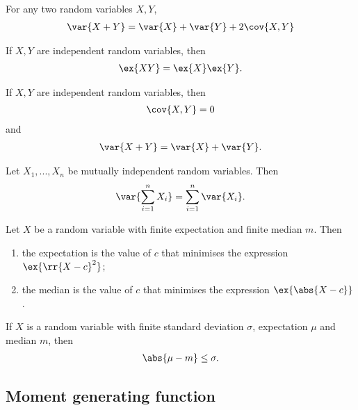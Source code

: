 \documentclass{article}
\begin{document}
\begin{theorem}
  For any two random variables $X,Y$,
  \begin{align*}
    \var{X+Y}=\var{X}+\var{Y}+2\cov{X,Y}
  \end{align*}
\end{theorem}

\begin{theorem}
  If $X,Y$ are independent random variables, then
  \begin{align*}
    \ex{XY}=\ex{X}\ex{Y}.
  \end{align*}
\end{theorem}

\begin{corollary}
  If $X,Y$ are independent random variables, then
  \begin{align*}
    \cov{X,Y}=0
  \end{align*}
  and
  \begin{align*}
    \var{X+Y}=\var{X}+\var{Y}.
  \end{align*}
\end{corollary}

\begin{theorem}
  Let $X_1,...,X_n$ be mutually independent random variables. Then
  \begin{align*}
    \var{\sum_{i=1}^{n} X_i}=\sum_{i=1}^{n} \var{X_i}.
  \end{align*}
\end{theorem}

\begin{theorem}
  Let $X$ be a random variable with finite expectation and finite median $m$. Then
  \begin{enumerate}
    \item the expectation is the value of $c$ that minimises the expression $\ex{\rr{X-c}^2}$;
    \item the median is the value of $c$ that minimises the expression $\ex{\abs{X-c}}$.
  \end{enumerate}
\end{theorem}

\begin{theorem}
  If $X$ is a random variable with finite standard deviation $\sigma$, expectation $\mu$ and
  median $m$, then
  \begin{align*}
    \abs{\mu-m}\leq\sigma.
  \end{align*}
\end{theorem}

\subsection{Moment generating function}\label{sec:moment-generating-function}
\end{document}
